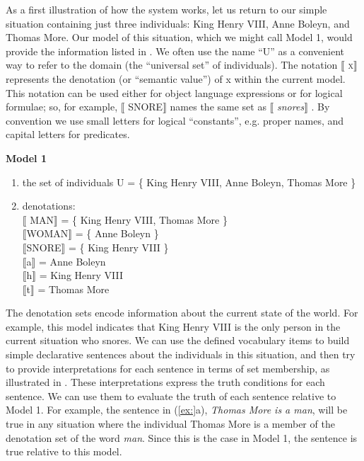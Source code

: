 As a first illustration of how the system works, let us return to our simple situation containing just three individuals: King Henry VIII, Anne Boleyn, and Thomas More. Our model of this situation, which we might call Model 1, would provide the information listed in . We often use the name “U” as a convenient way to refer to the domain (the “universal set” of individuals). The notation \textsc{$\llbracket$ x}$\rrbracket$  represents the denotation (or “semantic value”) of x within the current model. This notation can be used either for object language expressions or for logical formulae; so, for example, $\llbracket$ SNORE$\rrbracket$  names the same set as $\llbracket$ \textit{snores}$\rrbracket$ . By convention we use small letters for logical “constants”, e.g. proper names, and capital letters for predicates.


\textbf{Model 1}

\begin{enumerate}
\item the set of individuals U = \{ King Henry VIII, Anne Boleyn, Thomas More \}
\item denotations\textsc{:\\
{}$\llbracket$ }\textsc{MAN}$\rrbracket$  = \{ King Henry VIII, Thomas More \}\\
\textsc{$\llbracket$}WOMAN$\rrbracket$  = \{ Anne Boleyn \}\\
\textsc{$\llbracket$}SNORE$\rrbracket$  = \{ King Henry VIII \}\\
\textsc{$\llbracket$}a$\rrbracket$  = Anne Boleyn\\
\textsc{$\llbracket$}h$\rrbracket$  = King Henry VIII\\
\textsc{$\llbracket$}t$\rrbracket$  = Thomas More
\end{enumerate}

The denotation sets encode information about the current state of the world. For example, this model indicates that King Henry VIII is the only person in the current situation who snores. We can use the defined vocabulary items to build simple declarative sentences about the individuals in this situation, and then try to provide interpretations for each sentence in terms of set membership, as illustrated in . These interpretations express the truth conditions for each sentence. We can use them to evaluate the truth of each sentence relative to Model 1. For example, the sentence in (\ref{ex:}a), \textit{Thomas More is a man}, will be true in any situation where the individual Thomas More is a member of the denotation set of the word \textit{man}. Since this is the case in Model 1, the sentence is true relative to this model.




